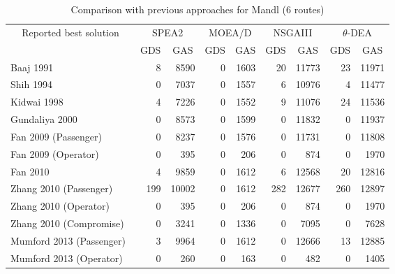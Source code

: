\begin{table}[!htbp]
	\centering
	\caption{Comparison with previous approaches for Mandl (6 routes)}
	\begin{tabular}{|l|r|r||r|r||r|r||r|r|}
		\hline
		\multicolumn{1}{|c|}{\multirow{2}[4]{*}{Reported best solution}} & \multicolumn{2}{c||}{SPEA2} & \multicolumn{2}{c||}{MOEA/D} & \multicolumn{2}{c||}{NSGAIII} & \multicolumn{2}{c|}{$\theta$-DEA} \\
		\cline{2-9}    \multicolumn{1}{|c|}{} & \multicolumn{1}{c|}{GDS} & \multicolumn{1}{c||}{GAS} & \multicolumn{1}{c|}{GDS} & \multicolumn{1}{c||}{GAS} & \multicolumn{1}{c|}{GDS} & \multicolumn{1}{c||}{GAS} & \multicolumn{1}{c|}{GDS} & \multicolumn{1}{c|}{GAS} \\
		\hline
		Baaj 1991~\cite{baaj1991ai} & 8     & 8590  & 0     & 1603  & 20    & 11773 & 23    & 11971 \\
		\hline
		Shih 1994~\cite{shih1994design} & 0     & 7037  & 0     & 1557  & 6     & 10976 & 4     & 11477 \\
		\hline
		Kidwai 1998~\cite{kidwai1998optimal} & 4     & 7226  & 0     & 1552  & 9     & 11076 & 24    & 11536 \\
		\hline
		Gundaliya 2000~\cite{gundaliya2000model} & 0     & 8573  & 0     & 1599  & 0     & 11832 & 0     & 11937 \\
		\hline
		Fan 2009 (Passenger)~\cite{fan2009simple} & 0     & 8237  & 0     & 1576  & 0     & 11731 & 0     & 11808 \\
		\hline
		Fan 2009 (Operator)~\cite{fan2009simple} & 0     & 395   & 0     & 206   & 0     & 874   & 0     & 1970 \\
		\hline
		Fan 2010~\cite{fan2010metaheuristic} & 4     & 9859  & 0     & 1612  & 6     & 12568 & 20    & 12816 \\
		\hline
		Zhang 2010 (Passenger)~\cite{zhang2010multi} & 199   & 10002 & 0     & 1612  & 282   & 12677 & 260   & 12897 \\
		\hline
		Zhang 2010 (Operator)~\cite{zhang2010multi} & 0     & 395   & 0     & 206   & 0     & 874   & 0     & 1970 \\
		\hline
		Zhang 2010 (Compromise)~\cite{zhang2010multi} & 0     & 3241  & 0     & 1336  & 0     & 7095  & 0     & 7628 \\
		\hline
		Mumford 2013 (Passenger)~\cite{mumford2013new} & 3     & 9964  & 0     & 1612  & 0     & 12666 & 13    & 12885 \\
		\hline
		Mumford 2013 (Operator)~\cite{mumford2013new} & 0     & 260   & 0     & 163   & 0     & 482   & 0     & 1405 \\

\end{tabular}
\end{table}
